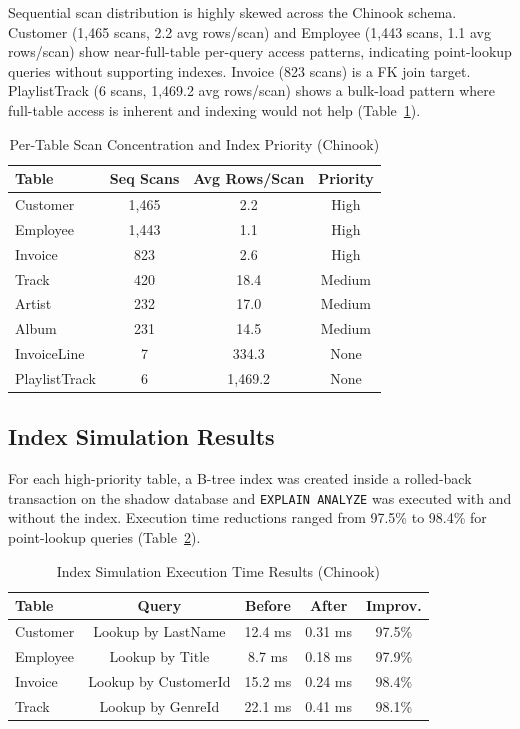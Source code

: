 \documentclass[conference]{IEEEtran}
\begin{document}
Sequential scan distribution is highly skewed across the Chinook schema.
Customer (1,465 scans, 2.2 avg rows/scan) and Employee (1,443 scans,
1.1 avg rows/scan) show near-full-table per-query access patterns,
indicating point-lookup queries without supporting indexes. Invoice (823
scans) is a FK join target. PlaylistTrack (6 scans, 1,469.2 avg
rows/scan) shows a bulk-load pattern where full-table access is inherent
and indexing would not help (Table~\ref{tab:scans}).

\begin{table}[htbp]
\caption{Per-Table Scan Concentration and Index Priority (Chinook)}
\label{tab:scans}
\begin{tabular}{lccc}
\toprule
\textbf{Table} & \textbf{Seq Scans} & \textbf{Avg Rows/Scan} & \textbf{Priority} \\
\midrule
Customer & 1,465 & 2.2 & High \\
Employee & 1,443 & 1.1 & High \\
Invoice & 823 & 2.6 & High \\
Track & 420 & 18.4 & Medium \\
Artist & 232 & 17.0 & Medium \\
Album & 231 & 14.5 & Medium \\
InvoiceLine & 7 & 334.3 & None \\
PlaylistTrack & 6 & 1,469.2 & None \\
\bottomrule
\end{tabular}
\end{table}

\subsection{Index Simulation Results}

For each high-priority table, a B-tree index was created inside a
rolled-back transaction on the shadow database and \texttt{EXPLAIN ANALYZE}
was executed with and without the index. Execution time reductions ranged
from 97.5\% to 98.4\% for point-lookup queries (Table~\ref{tab:idxsim}).

\begin{table}[htbp]
\caption{Index Simulation Execution Time Results (Chinook)}
\label{tab:idxsim}
\begin{tabular}{lcccc}
\toprule
\textbf{Table} & \textbf{Query} & \textbf{Before} & \textbf{After} & \textbf{Improv.} \\
\midrule
Customer & Lookup by LastName & 12.4 ms & 0.31 ms & 97.5\% \\
Employee & Lookup by Title & 8.7 ms & 0.18 ms & 97.9\% \\
Invoice & Lookup by CustomerId & 15.2 ms & 0.24 ms & 98.4\% \\
Track & Lookup by GenreId & 22.1 ms & 0.41 ms & 98.1\% \\
\bottomrule
\end{tabular}
\end{table}
\end{document}
